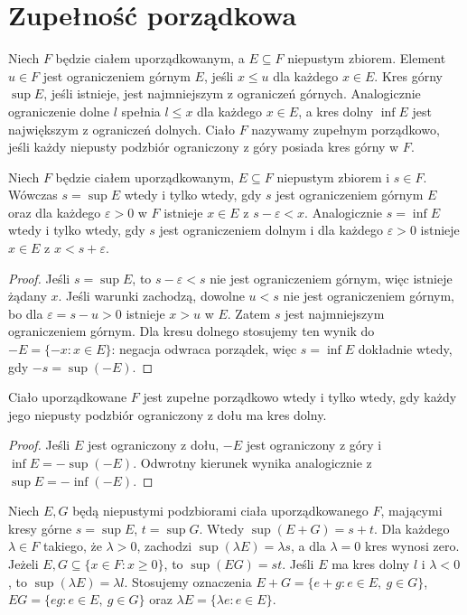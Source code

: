 \section{Zupełność porządkowa}
\begin{definicja}
\label{ma1:def:order-complete}
Niech $F$ będzie ciałem uporządkowanym, a $E\subseteq F$ niepustym zbiorem. Element $u\in F$ jest ograniczeniem górnym $E$, jeśli $x\le u$ dla każdego $x\in E$. Kres górny $\sup E$, jeśli istnieje, jest najmniejszym z ograniczeń górnych. Analogicznie ograniczenie dolne $l$ spełnia $l\le x$ dla każdego $x\in E$, a kres dolny $\inf E$ jest największym z ograniczeń dolnych. Ciało $F$ nazywamy zupełnym porządkowo, jeśli każdy niepusty podzbiór ograniczony z góry posiada kres górny w $F$.
\end{definicja}
\begin{lemat}
\label{ma1:lem:sup-criterion}
Niech $F$ będzie ciałem uporządkowanym, $E\subseteq F$ niepustym zbiorem i $s\in F$. Wówczas $s=\sup E$ wtedy i tylko wtedy, gdy $s$ jest ograniczeniem górnym $E$ oraz dla każdego $\varepsilon>0$ w $F$ istnieje $x\in E$ z $s-\varepsilon<x$. Analogicznie $s=\inf E$ wtedy i tylko wtedy, gdy $s$ jest ograniczeniem dolnym i dla każdego $\varepsilon>0$ istnieje $x\in E$ z $x<s+\varepsilon$.
\end{lemat}
\begin{proof}
Jeśli $s=\sup E$, to $s-\varepsilon<s$ nie jest ograniczeniem górnym, więc istnieje żądany $x$. Jeśli warunki zachodzą, dowolne $u<s$ nie jest ograniczeniem górnym, bo dla $\varepsilon=s-u>0$ istnieje $x>u$ w $E$. Zatem $s$ jest najmniejszym ograniczeniem górnym. Dla kresu dolnego stosujemy ten wynik do $-E=\{-x:x\in E\}$: negacja odwraca porządek, więc $s=\inf E$ dokładnie wtedy, gdy $-s=\sup(-E)$.
\end{proof}
\begin{wniosek}
\label{ma1:cor:inf-exists}
Ciało uporządkowane $F$ jest zupełne porządkowo wtedy i tylko wtedy, gdy każdy jego niepusty podzbiór ograniczony z dołu ma kres dolny.
\end{wniosek}
\begin{proof}
Jeśli $E$ jest ograniczony z dołu, $-E$ jest ograniczony z góry i $\inf E=-\sup(-E)$. Odwrotny kierunek wynika analogicznie z $\sup E=-\inf(-E)$.
\end{proof}
\begin{twierdzenie}
\label{ma1:thm:sup-arithmetic}
Niech $E,G$ będą niepustymi podzbiorami ciała uporządkowanego $F$, mającymi kresy górne $s=\sup E$, $t=\sup G$. Wtedy $\sup(E+G)=s+t$. Dla każdego $\lambda\in F$ takiego, że $\lambda>0$, zachodzi $\sup(\lambda E)=\lambda s$, a dla $\lambda=0$ kres wynosi zero. Jeżeli $E,G\subseteq\{x\in F:x\ge0\}$, to $\sup(EG)=st$. Jeśli $E$ ma kres dolny $l$ i $\lambda<0$, to $\sup(\lambda E)=\lambda l$. Stosujemy oznaczenia $E+G=\{e+g:e\in E,\ g\in G\}$, $EG=\{eg:e\in E,\ g\in G\}$ oraz $\lambda E=\{\lambda e:e\in E\}$.
\end{twierdzenie}
